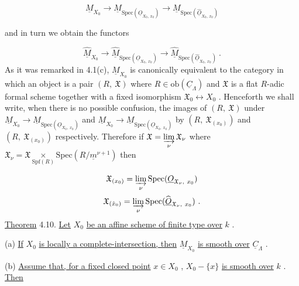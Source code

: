 \begin{equation*}
\underline{M}_{X_0} \to \underline{M}_{\mathrm{Spec}(\underline{O}_{X_0,\, x_0})} \to \underline{M}_{\mathrm{Spec}(\widehat{\underline{O}}_{X_0,\, x_0})} 
\end{equation*}


 and in turn we obtain the functors

\begin{equation*}
\widehat{\underline{M}}_{X_0} \to \widehat{\underline{M}}_{\mathrm{Spec}(\underline{O}_{X_0,\ x_0})} \to \widehat{\underline{M}}_{\mathrm{Spec}(\widehat{\underline{O}}_{X_0,\ x_0})}\ .
\end{equation*}
As it was remarked in 4.1(c), $\underline{M}_{X_0}$  is canonically equivalent to the category in which an object is a pair  $(R,\ \mathfrak{X})$  where  $R \in \mathrm{ob}(\underline{C}_{\Lambda})$  and  $\mathfrak{X}$  is a flat $R$-adic formal scheme together with a fixed isomorphism  $\mathfrak{X}_0 \longleftrightarrow X_0$ . Henceforth we shall write, when there is no possible confusion, the images of  $(R,\ \mathfrak{X})$  under $\underline{M}_{X_0} \to \underline{M}_{\mathrm{Spec}(\underline{O}_{X_0,\ x_0})}$  and  $\underline{M}_{X_0} \to \underline{M}_{\mathrm{Spec}(\underline{O}_{X_0,\ x_0})}$  by  $(R,\ \mathfrak{X}_{(x_0)})$  and  $(R,\ \mathfrak{X}_{(x_0)})$ respectively. Therefore if  $\mathfrak{X} = \varinjlim\limits_{\nu} \mathfrak{X}_{\nu}$  where  $\mathfrak{X}_{\nu} = \mathfrak{X} \underset{\mathrm{Spf}(R)}{\times} \mathrm{Spec}(R/\underline{m}^{\nu+1})$    then

\begin{equation*}
\mathfrak{X}_{(x_0)} = \varinjlim\limits_{\nu} \mathrm{Spec}(\underline{O}_{\mathfrak{X}_{\nu},\ x_0})
\end{equation*}
\begin{equation*}
\mathfrak{X}_{(\hat{x}_0)} = \varinjlim\limits_{\nu} \mathrm{Spec}(\widehat{\underline{O}}_{\mathfrak{X}_{\nu},\ x_0})\ .
\end{equation*}
\underline{Theorem} 4.10. \underline{Let}  $X_0$  \underline{be an affine scheme of finite type over}  $k$  .

(a)  \underline{If}  $X_0$  \underline{is locally a complete-intersection, then}  $\underline{M}_{X_0}$  \underline{is smooth over}  $\underline{C}_{\Lambda}$  .

(b)  \underline{Assume that, for a fixed closed point}  $x \in X_0$  ,  $X_0 - \{x\}$  \underline{is smooth over}  $k$  . \underline{Then}

